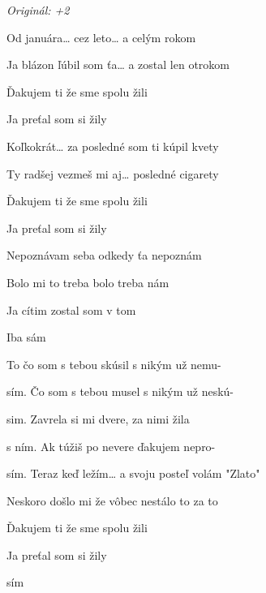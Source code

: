 \begin{song}


\begin{strumbox}
\textit{Originál: +2}
\end{strumbox}

\begin{hchordbox}
\end{hchordbox}

\Large

\bigskip


 Od januára… cez leto… a celým rokom \par
{} Ja blázon ľúbil som ťa… a zostal len otrokom \par
{}Ďakujem ti že sme spolu žili \par
Ja preťal som si žily \par

\bigskip

 Koľkokrát… za posledné som ti kúpil kvety \par
{} Ty radšej vezmeš mi aj… posledné cigarety \par
{}Ďakujem ti že sme spolu žili \par
Ja preťal som si žily \par

\bigskip

\begin{chorusbox}{\PredrefrenARefren}
Nepoznávam seba odkedy ťa nepoznám \par
{} Bolo mi to treba  bolo treba nám \par
{} Ja cítim zostal som v tom \par
Iba sám \par

\bigskip

 To čo som s tebou skúsil  s nikým už nemu- \par
{}sím. Čo som s tebou musel  s nikým už neskú- \par
{}sim. Zavrela si mi dvere,  za nimi žila \par
{}s ním. Ak túžiš po nevere  ďakujem nepro- \par
\end{chorusbox}

\bigskip

sím. Teraz keď ležím… a svoju posteľ volám "Zlato" \par
{} Neskoro došlo mi že vôbec nestálo to za to \par
{}Ďakujem ti že sme spolu žili \par
Ja preťal som si žily \par

\bigskip

\PredrefrenARefren

\bigskip

sím


\end{song}